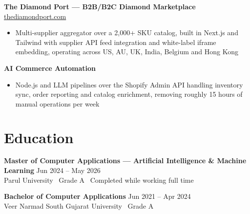 \documentclass[10pt]{article}
\begin{document}
\textbf{The Diamond Port --- B2B/B2C Diamond Marketplace} \hfill \href{https://thediamondport.com}{thediamondport.com}
\begin{itemize}
  \item Multi-supplier aggregator over a 2,000+ SKU catalog, built in Next.js and Tailwind with supplier API feed integration and white-label iframe embedding, operating across US, AU, UK, India, Belgium and Hong Kong
\end{itemize}

\vspace{1pt}

\textbf{AI Commerce Automation}
\begin{itemize}
  \item Node.js and LLM pipelines over the Shopify Admin API handling inventory sync, order reporting and catalog enrichment, removing roughly 15 hours of manual operations per week
\end{itemize}

\section*{Education}

\textbf{Master of Computer Applications --- Artificial Intelligence \& Machine Learning} \hfill Jun 2024 -- May 2026 \\
Parul University \textbullet\ Grade A \textbullet\ Completed while working full time

\vspace{1pt}

\textbf{Bachelor of Computer Applications} \hfill Jun 2021 -- Apr 2024 \\
Veer Narmad South Gujarat University \textbullet\ Grade A
\end{document}
